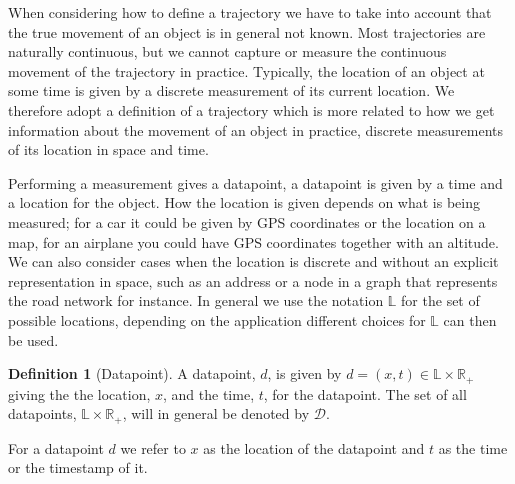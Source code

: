 \documentclass[12pt]{article}
\newcommand{\loc}{x}
\newcommand{\tim}{t}
\newcommand{\data}{d}
\newcommand{\locset}{\mathbb{L}}
\newcommand{\timeset}{\mathbb{R}_+}
\newcommand{\dataset}{\mathcal{D}}
\theoremstyle{definition}
\newtheorem{definition}{Definition}[section]
\begin{document}
When considering how to define a trajectory we have to take into
account that the true movement of an object is in general not known.
Most trajectories are naturally continuous, but we cannot capture or
measure the continuous movement of the trajectory in practice.
Typically, the location of an object at some time is given by a
discrete measurement of its current location. We therefore adopt a
definition of a trajectory which is more related to how we get
information about the movement of an object in practice, discrete
measurements of its location in space and time.

Performing a measurement gives a datapoint, a datapoint is given by a
time and a location for the object. How the location is given depends
on what is being measured; for a car it could be given by GPS
coordinates or the location on a map, for an airplane you could have
GPS coordinates together with an altitude. We can also consider cases
when the location is discrete and without an explicit representation
in space, such as an address or a node in a graph that represents the
road network for instance. In general we use the notation \(\locset\)
for the set of possible locations, depending on the application
different choices for \(\locset\) can then be used.
\begin{definition}[Datapoint]
  \label{def:datapoint}
  A datapoint, \(\data\), is given by
  \(\data = (\loc, \tim) \in \locset \times \timeset\) giving the the
  location, \(\loc\), and the time, \(\tim\), for the datapoint. The
  set of all datapoints, \(\locset \times \timeset\), will in general
  be denoted by \(\dataset\).
\end{definition}
For a datapoint \(\data\) we refer to \(\loc\) as the location of the
datapoint and \(\tim\) as the time or the timestamp of it.
\end{document}
